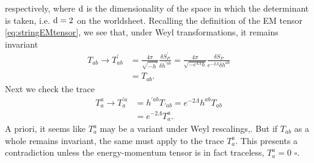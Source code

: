 respectively, where $\mathrm{d}$ is the dimensionality of the space in which the determinant is taken, i.e. $\mathrm{d}=2$ on the worldsheet. Recalling the definition of the EM tensor \ref{eq:stringEMtensor}, we see that, under Weyl transformations, it remains invariant
\begin{align*}
	T_{ab}\rightarrow T^\prime_{ab} &= \frac{4 \pi}{\sqrt{-h^\prime}} \frac{\delta S^\prime_P}{\delta h^{\prime ab}} = \frac{4 \pi}{\sqrt{-e^{4 \Lambda} h} } \frac{\delta S_P}{e^{-2 \Lambda} \delta h^{ab}} \\
	&= T_{ab}.
\end{align*}
Next we check the trace
\begin{align*}
	T^a_a\rightarrow T^{\prime a}_a &= h^{\prime ab} T_{\prime a b} = e^{-2 \Lambda} h^{ab} T_{ab} \\
	&=e^{-2 \Lambda} T^a_a.
\end{align*}
A priori, it seems like $T^a_a$ may be a variant under Weyl rescalings,. But if $T_{ab}$ as a whole remains invariant, the same must apply to the trace $T^a_a$. This presents a contradiction unless the energy-momentum tensor is in fact traceless, $T^a_a=0$ $\square$.\\
